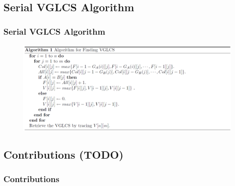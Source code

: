 \subsection{Serial VGLCS Algorithm}
\begin{frame}
    \frametitle{Serial VGLCS Algorithm}
    \begin{figure}
        \includegraphics[scale=0.3]{figure/fig-VGLCS-algo.png}
    \end{figure}
\end{frame}

\subsection{Contributions (TODO)}
\begin{frame}
    \frametitle{Contributions}
\end{frame}
